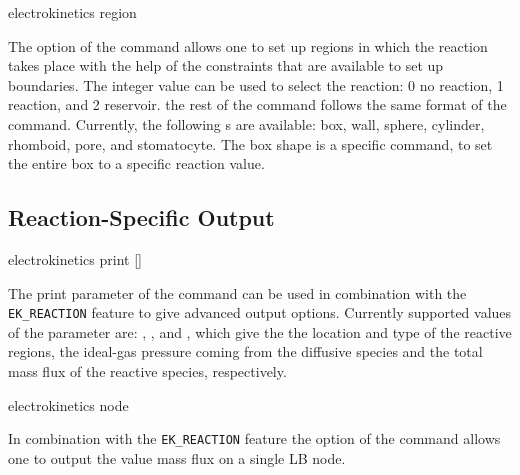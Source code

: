 \begin{essyntax}
  electrokinetics 
  region
   
  \begin{features}
  \end{features}
\end{essyntax}
The  option of the  command allows one 
to set up regions in which the reaction takes place with the help of the constraints
that are available to set up boundaries. The integer value 
can be used to select the reaction: 0 no reaction, 1 reaction, and 2 reservoir.
the rest of the command follows the same format of the 
command. Currently, the following s are available: box,
wall, sphere, cylinder, rhomboid, pore, and stomatocyte. The box shape is a 
 specific command, to set the entire box to a specific reaction value.

\subsection{\label{ssec:ek-reac-output}Reaction-Specific Output}

\begin{essyntax}
  electrokinetics print 
    []
  \begin{features}
  \end{features}
\end{essyntax}
The print parameter of the  command can be used in combination
with the \texttt{EK\_REACTION} feature to give advanced output options. Currently
supported values of the parameter  are: , 
, and , which give the the location and type of 
the reactive regions, the ideal-gas pressure coming from the diffusive species and
the total mass flux of the reactive species, respectively.

\begin{essyntax}
  electrokinetics node    
  \begin{features}
  \end{features}
\end{essyntax}
In combination with the \texttt{EK\_REACTION} feature the  option of the
 command allows one to output the value mass flux on a single 
LB node.

